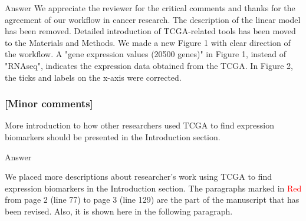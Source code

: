 \documentclass[preprint,12pt]{elsarticle}
\newenvironment{MyColorPar}[1]{%
    \leavevmode\color{#1}\ignorespaces%
}{%
}%
\begin{document}
%
\begin{MyColorPar}{blue}
Answer
We appreciate the reviewer for the critical comments and thanks for the agreement of our workflow in cancer research.
The description of the linear model has been removed. 
Detailed introduction of TCGA-related tools has been moved to the Materials and Methods.
We made a new Figure 1 with clear direction of the workflow.
A "gene expression values (20500 genes)" in Figure 1, instead of "RNAseq", indicates the expression data obtained from the TCGA.
In Figure 2, the ticks and labels on the x-axis were corrected.\\[0.5cm]


\begin{MyColorPar}{black} %
\subsubsection*{[Minor comments]}

More introduction to how other researchers used TCGA to find expression biomarkers should be presented in the Introduction section.
\end{MyColorPar}

Answer

We placed more descriptions about researcher's work using TCGA to find expression biomarkers in the Introduction section.
The paragraphs marked in \textcolor{red}{Red} from page 2 (line 77) to page 3 (line 129) are the part of the manuscript that has been revised. Also, it is shown here in the following paragraph.\\[0.3cm]

\begin{MyColorPar}{red}


\end{MyColorPar}
\end{MyColorPar}
\end{document}
